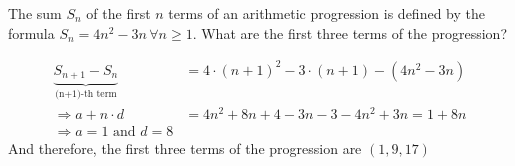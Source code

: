 
\question[2] The sum $S_n$ of the first $n$ terms of an arithmetic progression is defined by
the formula $S_n = 4n^2-3n \,\forall n \geq 1$. What are the first three terms of the progression? 


\ifprintanswers
\fi 

\begin{solution}[\halfpage]
	\begin{align}
		\underbrace{S_{n+1}-S_{n}}_{\text{(n+1)-th term}} &= 4\cdot(n+1)^2-3\cdot(n+1) - (4n^2-3n) \\
		\Rightarrow a + n\cdot d &= 4n^2+8n+4-3n-3-4n^2+3n = 1 + 8n \\
		\Rightarrow a = 1 \text{ and } d = 8
	\end{align}
	And therefore, the first three terms of the progression are $(1,9,17)$
\end{solution}

